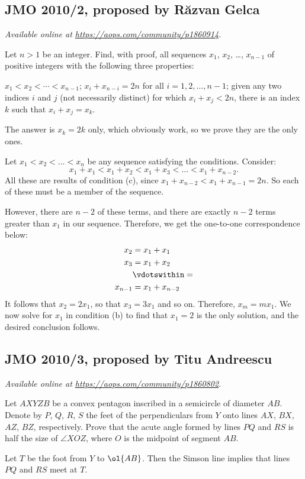\documentclass[11pt]{scrartcl}
\begin{document}
\subsection{JMO 2010/2, proposed by R\u{a}zvan Gelca}
\textsl{Available online at \url{https://aops.com/community/p1860914}.}
\begin{mdframed}[style=mdpurplebox,frametitle={Problem statement}]
Let $n > 1$ be an integer.  Find, with proof, all sequences
$x_1$, $x_2$, \dots, $x_{n-1}$ of positive integers
with the following three properties:
\begin{enumerate}[(a)]
 \ii $x_1 < x_2 < \dotsb < x_{n-1}$;
 \ii $x_i + x_{n-i} = 2n$ for all $i = 1, 2, \dots , n - 1$;
 \ii given any two indices $i$ and $j$ (not necessarily distinct)
 for which $x_i + x_j < 2n$,
 there is an index $k$ such that $x_i + x_j = x_k$.
\end{enumerate}
\end{mdframed}
The answer is $x_k = 2k$ only, which obviously work,
so we prove they are the only ones.

Let $x_1 < x_2 < \dots < x_n$ be
any sequence satisfying the conditions.
Consider:
\[ x_1 + x_1 < x_1 + x_2 < x_1 + x_3 < \dots
  < x_1 + x_{n-2}. \]
All these are results of condition (c),
since $x_1 + x_{n-2} < x_1 + x_{n-1} = 2n$.
So each of these must be a member of the sequence.

However, there are $n-2$ of these terms,
and there are exactly $n-2$ terms greater
than $x_1$ in our sequence.
Therefore, we get the one-to-one correspondence below:
\begin{align*}
  x_2 &= x_1 + x_1 \\
  x_3 &= x_1 + x_2 \\
  & \vdotswithin= \\
  x_{n-1} &= x_1 + x_{n-2}
\end{align*}
It follows that $x_2 = 2x_1$,
so that $x_3 = 3x_1$ and so on.
Therefore, $x_m = m x_1$.
We now solve for $x_1$ in condition (b)
to find that $x_1=2$ is the only solution,
and the desired conclusion follows.
\pagebreak

\subsection{JMO 2010/3, proposed by Titu Andreescu}
\textsl{Available online at \url{https://aops.com/community/p1860802}.}
\begin{mdframed}[style=mdpurplebox,frametitle={Problem statement}]
Let $AXYZB$ be a convex pentagon inscribed in a semicircle of diameter $AB$.
Denote by $P$, $Q$, $R$, $S$ the feet of the perpendiculars
from $Y$ onto lines $AX$, $BX$, $AZ$, $BZ$, respectively.
Prove that the acute angle formed by lines $PQ$ and $RS$
is half the size of $\angle XOZ$,
where $O$ is the midpoint of segment $AB$.
\end{mdframed}
Let $T$ be the foot from $Y$ to $\ol{AB}$.
Then the Simson line implies that lines $PQ$ and $RS$ meet at $T$.
\end{document}
